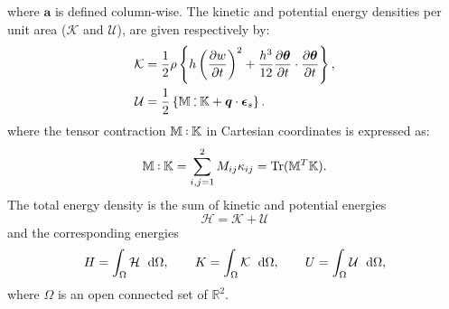 \documentclass[11pt]{article}
\DeclareMathOperator{\Tr}{Tr}
\def\onedot{$\mathsurround0pt\ldotp$}
\def\cddot{%
	\mathbin{\vcenter{\baselineskip.67ex
			\hbox{\onedot}\hbox{\onedot}}%
}}
\begin{document}
{\begin{equation*}
		\end{equation*}
		where $\bm{a}$ is defined column-wise. The kinetic and potential energy densities per unit area ($\mathcal{K}$ and $\mathcal{U}$), are given respectively by:
		\begin{align*}
		\mathcal{K} &= \frac{1}{2} \rho \left\{ h \left(\diffp{w}{t}\right)^2 +  \frac{h^3}{12} \diffp{\bm\theta}{t} \cdot \diffp{\bm\theta}{t} \right\} ,\\
		\mathcal{U} &= \frac{1}{2} \left\{ \mathbb{M} \cddot \mathbb{K} + \bm{q} \cdot \bm{\epsilon}_s \right\} .	
		\end{align*} 
		where the tensor contraction $ \mathbb{M} \cddot \mathbb{K}$ in Cartesian coordinates is expressed as:
		\[\mathbb{M} \cddot \mathbb{K} = \sum_{i,j = 1}^{2} M_{ij} \kappa_{ij} = \Tr(\mathbb{M}^T \mathbb{K}). \]
		The total energy density is the sum of kinetic and potential energies
		\begin{equation}
		\mathcal{H} = \mathcal{K} + \mathcal{U}
		\end{equation}
		and the corresponding energies
		\begin{equation}
		H = \int_{\Omega} \mathcal{H} \ \d\Omega, \qquad K = \int_{\Omega} \mathcal{K} \ \d\Omega, \qquad U = \int_{\Omega} \mathcal{U} \ \d\Omega,
		\end{equation}
		where $\Omega$ is an open connected set of $\mathbb{R}^2$.
	}
	
\end{document}
